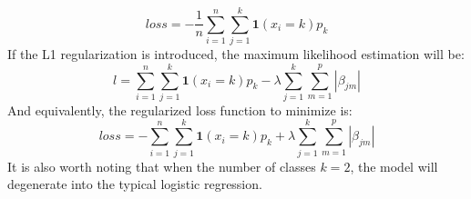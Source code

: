 \begin{equation}
	loss=-\frac{1}{n}\sum_{i=1}^{n}\sum_{j=1}^k \boldsymbol{1}(x_i=k)p_k
\end{equation}
If the L1 regularization is introduced, the maximum likelihood estimation will be:
\begin{equation}
	l=\sum_{i=1}^{n}\sum_{j=1}^k \boldsymbol{1}(x_i=k)p_k-\lambda \sum_{j=1}^{k}\sum_{m=1}^{p}|\beta_{jm}|
\end{equation}
And equivalently, the regularized loss function to minimize is:
\begin{equation}
	loss=-\sum_{i=1}^{n}\sum_{j=1}^k \boldsymbol{1}(x_i=k)p_k+\lambda \sum_{j=1}^{k}\sum_{m=1}^{p}|\beta_{jm}|
\end{equation}
It is also worth noting that when the number of classes $k=2$, the model will degenerate into the typical logistic regression.\\
\\

